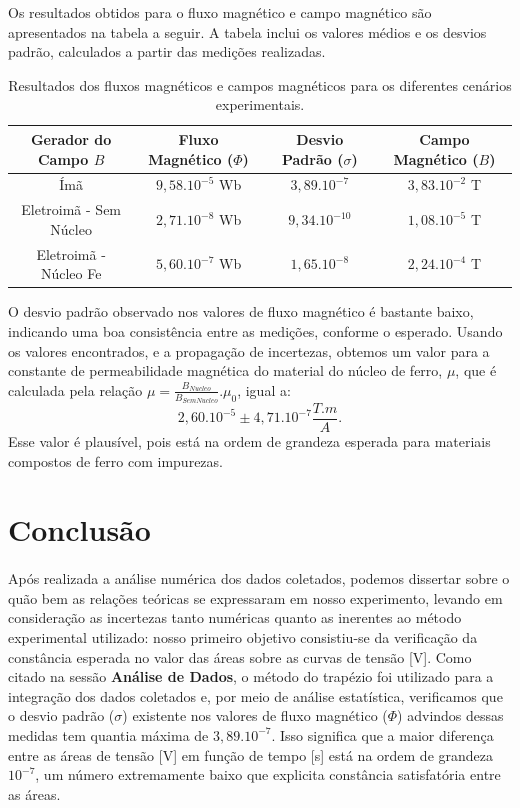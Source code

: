 \documentclass[column,brazilian,12pt,a4paper,final]{article}
\begin{document}
Os resultados obtidos para o fluxo magnético e campo magnético são apresentados na tabela a seguir. A tabela inclui os valores médios e os desvios padrão, calculados a partir das medições realizadas.
\begin{table}[H]
    \centering
    \begin{tabular}{|c|c|c|c|}
        \hline
        Gerador do Campo $B$ & Fluxo Magnético ($\Phi$) & Desvio Padrão ($\sigma$)& Campo Magnético ($B$) \\
        \hline
        Ímã & $9,58.10^{-5}$ Wb &  $3,89.10^{-7}$ & $3,83.10^{-2}$ T \\
        Eletroimã - Sem Núcleo & $2,71.10^{-8}$ Wb & $9,34.10^{-10}$ & $1,08.10^{-5}$ T \\
        Eletroimã - Núcleo Fe & $5,60.10^{-7}$ Wb & $1,65.10^{-8}$ & $2,24.10^{-4}$ T \\
        \hline
    \end{tabular}
    \caption{Resultados dos fluxos magnéticos e campos magnéticos para os diferentes cenários experimentais.}
    \label{tab:resultados_fluxo_campo}
\end{table}
O desvio padrão observado nos valores de fluxo magnético é bastante baixo, indicando uma boa consistência entre as medições, conforme o esperado.
Usando os valores encontrados, e a propagação de incertezas, obtemos um valor para a constante de permeabilidade magnética do material do núcleo de ferro, $\mu$, que é calculada pela relação $\mu = \frac{B_{Nucleo}}{B_{Sem Nucleo}} . \mu_0$, igual a:
\begin{equation}
    2,60.10^{-5} \pm 4,71.10^{-7} \frac{T.m}{A}. 
\end{equation}
Esse valor é plausível, pois está na ordem de grandeza esperada para materiais compostos de ferro com impurezas.

\section{Conclusão}
\paragraph{}
Após realizada a análise numérica dos dados coletados, podemos dissertar sobre o quão bem as relações teóricas se expressaram em nosso experimento, levando em consideração as incertezas tanto numéricas quanto as inerentes ao método experimental utilizado: nosso primeiro objetivo consistiu-se da verificação da constância esperada no valor das áreas sobre as curvas de tensão [V]. Como citado na sessão \textbf{Análise de Dados}, o método do trapézio foi utilizado para a integração dos dados coletados e, por meio de análise estatística, verificamos que o desvio padrão ($\sigma$) existente nos valores de fluxo magnético ($\Phi$) advindos dessas medidas tem quantia máxima de $3,89.10^{-7}$. Isso significa que a maior diferença entre as áreas de tensão [V] em função de tempo [s] está na ordem de grandeza $10^{-7}$, um número extremamente baixo que explicita constância satisfatória entre as áreas.
\end{document}

